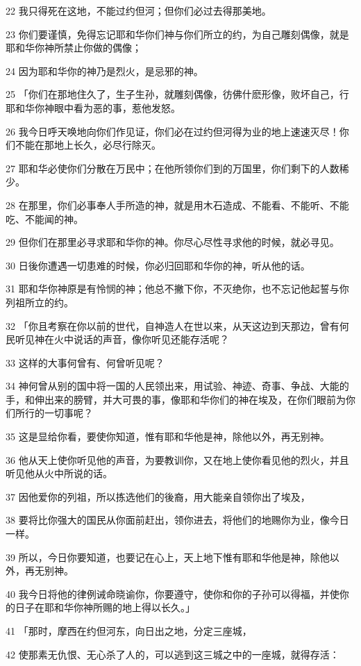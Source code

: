 \par 22 我只得死在这地，不能过约但河；但你们必过去得那美地。
\par 23 你们要谨慎，免得忘记耶和华你们神与你们所立的约，为自己雕刻偶像，就是耶和华你神所禁止你做的偶像；
\par 24 因为耶和华你的神乃是烈火，是忌邪的神。
\par 25 「你们在那地住久了，生子生孙，就雕刻偶像，彷佛什麽形像，败坏自己，行耶和华你神眼中看为恶的事，惹他发怒。
\par 26 我今日呼天唤地向你们作见证，你们必在过约但河得为业的地上速速灭尽！你们不能在那地上长久，必尽行除灭。
\par 27 耶和华必使你们分散在万民中；在他所领你们到的万国里，你们剩下的人数稀少。
\par 28 在那里，你们必事奉人手所造的神，就是用木石造成、不能看、不能听、不能吃、不能闻的神。
\par 29 但你们在那里必寻求耶和华你的神。你尽心尽性寻求他的时候，就必寻见。
\par 30 日後你遭遇一切患难的时候，你必归回耶和华你的神，听从他的话。
\par 31 耶和华你神原是有怜悯的神；他总不撇下你，不灭绝你，也不忘记他起誓与你列祖所立的约。
\par 32 「你且考察在你以前的世代，自神造人在世以来，从天这边到天那边，曾有何民听见神在火中说话的声音，像你听见还能存活呢？
\par 33 这样的大事何曾有、何曾听见呢？
\par 34 神何曾从别的国中将一国的人民领出来，用试验、神迹、奇事、争战、大能的手，和伸出来的膀臂，并大可畏的事，像耶和华你们的神在埃及，在你们眼前为你们所行的一切事呢？
\par 35 这是显给你看，要使你知道，惟有耶和华他是神，除他以外，再无别神。
\par 36 他从天上使你听见他的声音，为要教训你，又在地上使你看见他的烈火，并且听见他从火中所说的话。
\par 37 因他爱你的列祖，所以拣选他们的後裔，用大能亲自领你出了埃及，
\par 38 要将比你强大的国民从你面前赶出，领你进去，将他们的地赐你为业，像今日一样。
\par 39 所以，今日你要知道，也要记在心上，天上地下惟有耶和华他是神，除他以外，再无别神。
\par 40 我今日将他的律例诫命晓谕你，你要遵守，使你和你的子孙可以得福，并使你的日子在耶和华你神所赐的地上得以长久。」
\par 41 「那时，摩西在约但河东，向日出之地，分定三座城，
\par 42 使那素无仇恨、无心杀了人的，可以逃到这三城之中的一座城，就得存活：
